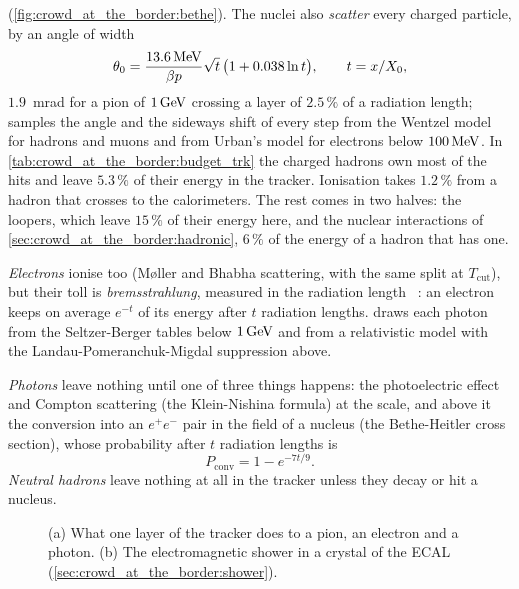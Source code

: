 (\cref{fig:crowd_at_the_border:bethe}). The nuclei also \emph{scatter}
every charged particle, by an angle of width~\cite{Highland:1975pq,Lynch:1990sq}
\begin{equation}
  \theta_0=\frac{13.6\,\mathrm{MeV}}{\beta p}\sqrt{t}\,\big(1+0.038\ln t\big),\qquad t=x/X_0 ,
  \label{eq:crowd_at_the_border:highland}
\end{equation}
$1.9$~mrad for a pion of $1\,\mathrm{GeV}$ crossing a layer of $2.5\,\%$ of a
radiation length; \GEANT samples the angle and the sideways shift of every
step from the Wentzel model for hadrons and muons and from Urban's model
for electrons below $100\,\mathrm{MeV}$. In \cref{tab:crowd_at_the_border:budget_trk}
the charged hadrons own most of the hits and leave
$5.3\,\%$
of their energy in the tracker. Ionisation takes $1.2\,\%$ from a hadron
that crosses to the calorimeters. The rest comes in two halves: the
loopers, which leave $15\,\%$ of their energy here, and the nuclear
interactions of \cref{sec:crowd_at_the_border:hadronic}, $6\,\%$ of the
energy of a hadron that has one.

\emph{Electrons} ionise too (M\o ller and Bhabha scattering, with the same
split at $T_{\mathrm{cut}}$), but their toll is \emph{bremsstrahlung},
measured in the radiation length \Xzero~\cite{Tsai:1973py}: an electron
keeps on average $e^{-t}$ of its energy after $t$ radiation lengths. \GEANT
draws each photon from the Seltzer-Berger tables below $1\,\mathrm{GeV}$ and from a
relativistic model with the Landau-Pomeranchuk-Migdal suppression above.

\emph{Photons} leave nothing until one of three things happens: the
photoelectric effect and Compton scattering (the Klein-Nishina formula) at
the \MeV scale, and above it the conversion into an $e^+e^-$ pair in the
field of a nucleus (the Bethe-Heitler cross section), whose probability
after $t$ radiation lengths is
\begin{equation}
  P_{\mathrm{conv}}=1-e^{-7t/9}.
  \label{eq:crowd_at_the_border:conversion}
\end{equation}
\emph{Neutral hadrons} leave nothing at all in the tracker unless they
decay or hit a nucleus.

\begin{figure}[htbp]\centering
\resizebox{\textwidth}{!}{}
\caption[Electromagnetic physics in a layer and in a crystal]{(a) What one
layer of the tracker does to a pion, an electron and a photon. (b) The
electromagnetic shower in a crystal of the ECAL
(\cref{sec:crowd_at_the_border:shower}).}
\label{fig:crowd_at_the_border:em_sketch}
\end{figure}

